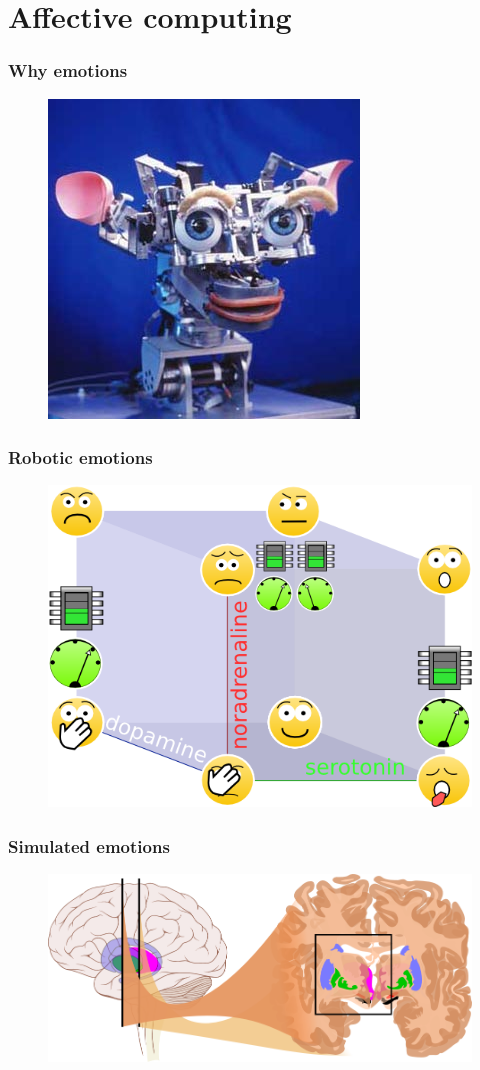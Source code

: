 \documentclass[12pt, aspectratio=169]{beamer}
\begin{document}
\section{Affective computing}
\begin{frame}
\frametitle{Why emotions}
\begin{figure}
  \includegraphics[width=0.5\linewidth]{Kismet_312}
\end{figure}
\end{frame}
\begin{frame}
\frametitle{Robotic emotions}
\begin{figure}
  \includegraphics[width=0.6\linewidth]{cube_of_emotional_parameters_machine}
\end{figure}
\end{frame}
\begin{frame}
\frametitle{Simulated emotions}
\begin{figure}
  \includegraphics[width=0.8\linewidth]{Basal_ganglia_circuits_cropped}
\end{figure}
\end{frame}
\end{document}
